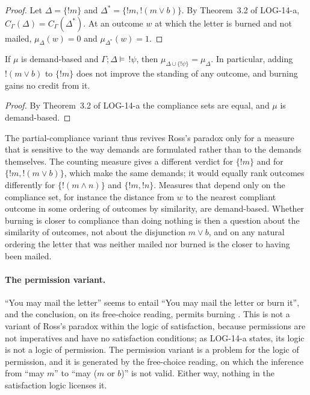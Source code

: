 \documentclass{situationist-preprint}
\begin{document}
\begin{proof}
Let $\Delta = \{!m\}$ and $\Delta^* = \{!m, !(m \vee b)\}$. By Theorem~3.2 of LOG-14-a, $C_\Gamma(\Delta) = C_\Gamma(\Delta^*)$. At an outcome $w$ at which the letter is burned and not mailed, $\mu_\Delta(w) = 0$ and $\mu_{\Delta^*}(w) = 1$.
\end{proof}

\begin{proposition}\label{p:demand}
If $\mu$ is demand-based and $\Gamma; \Delta \models\, !\psi$, then $\mu_{\Delta \cup \{!\psi\}} = \mu_\Delta$. In particular, adding $!(m \vee b)$ to $\{!m\}$ does not improve the standing of any outcome, and burning gains no credit from it.
\end{proposition}

\begin{proof}
By Theorem~3.2 of LOG-14-a the compliance sets are equal, and $\mu$ is demand-based.
\end{proof}

The partial-compliance variant thus revives Ross's paradox only for a measure that is sensitive to the way demands are formulated rather than to the demands themselves. The counting measure gives a different verdict for $\{!m\}$ and for $\{!m, !(m \vee b)\}$, which make the same demands; it would equally rank outcomes differently for $\{!(m \wedge n)\}$ and $\{!m, !n\}$. Measures that depend only on the compliance set, for instance the distance from $w$ to the nearest compliant outcome in some ordering of outcomes by similarity, are demand-based. Whether burning is closer to compliance than doing nothing is then a question about the similarity of outcomes, not about the disjunction $m \vee b$, and on any natural ordering the letter that was neither mailed nor burned is the closer to having been mailed.

\paragraph{The permission variant.} \enquote{You may mail the letter} seems to entail \enquote{You may mail the letter or burn it}, and the conclusion, on its free-choice reading, permits burning \citep{Kamp1973}. This is not a variant of Ross's paradox within the logic of satisfaction, because permissions are not imperatives and have no satisfaction conditions; as LOG-14-a states, its logic is not a logic of permission. The permission variant is a problem for the logic of permission, and it is generated by the free-choice reading, on which the inference from \enquote{may $m$} to \enquote{may ($m$ or $b$)} is not valid. Either way, nothing in the satisfaction logic licenses it.
\end{document}
